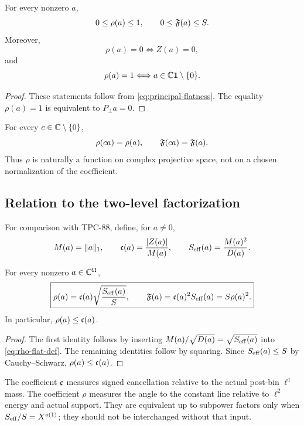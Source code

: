 \begin{corollary}
\label{cor:principal-equality-cases}
For every nonzero \(a\),
\[
 0\le\rho(a)\le1,\qquad 0\le\mathfrak F(a)\le S.
\]
Moreover,
\[
 \rho(a)=0
 \Longleftrightarrow Z(a)=0,
\]
and
\[
 \rho(a)=1
 \Longleftrightarrow
 a\in\mathbb C\mathbf 1\setminus\{0\}.
\]
\end{corollary}

\begin{proof}
These statements follow from
\eqref{eq:principal-flatness}.  The equality \(\rho(a)=1\) is
equivalent to \(P_\perp a=0\).
\end{proof}

\begin{remark}
\label{rem:scale-phase-invariance}
For every \(c\in\mathbb C\setminus\{0\}\),
\[
 \rho(ca)=\rho(a),\qquad
 \mathfrak F(ca)=\mathfrak F(a).
\]
Thus \(\rho\) is naturally a function on complex projective space,
not on a chosen normalization of the coefficient.
\end{remark}

\subsection{Relation to the two-level factorization}

For comparison with TPC-88, define, for \(a\ne0\),
\[
 M(a)=\|a\|_1,\qquad
 \mathfrak c(a)=\frac{|Z(a)|}{M(a)},\qquad
 S_{\mathrm{eff}}(a)=\frac{M(a)^2}{D(a)}.
\]

\begin{proposition}
\label{prop:tpc88-dictionary}
For every nonzero \(a\in\mathbb C^\Omega\),
\begin{equation}
 \boxed{
 \rho(a)
 =\mathfrak c(a)\sqrt{\frac{S_{\mathrm{eff}}(a)}{S}},
 \qquad
 \mathfrak F(a)
 =\mathfrak c(a)^2S_{\mathrm{eff}}(a)
 =S\rho(a)^2.}
\label{eq:tpc88-dictionary}
\end{equation}
In particular, \(\rho(a)\le\mathfrak c(a)\).
\end{proposition}

\begin{proof}
The first identity follows by inserting
\(M(a)/\sqrt{D(a)}=\sqrt{S_{\mathrm{eff}}(a)}\) into
\eqref{eq:rho-flat-def}.  The remaining identities follow by
squaring.  Since \(S_{\mathrm{eff}}(a)\le S\) by Cauchy--Schwarz,
\(\rho(a)\le\mathfrak c(a)\).
\end{proof}

\begin{remark}
The coefficient \(\mathfrak c\) measures signed cancellation relative to
the actual post-bin \(\ell^1\) mass.  The coefficient \(\rho\)
measures the angle to the constant line relative to \(\ell^2\)
energy and actual support.  They are equivalent up to subpower
factors only when \(S_{\mathrm{eff}}/S=X^{o(1)}\); they should not be
interchanged without that input.
\end{remark}


